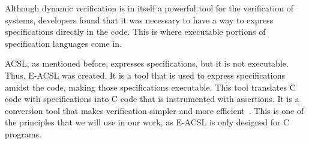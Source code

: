 Although dynamic verification is in itself a powerful tool for the verification of systems, 
developers found that it was necessary to have a way to express specifications directly in the 
code. This is where executable portions of specification languages come in. 

ACSL, as mentioned before, expresses specifications, but it is not executable. Thus, 
E-ACSL was created. It is a tool that is used to express specifications 
amidst the code, making those specifications executable. This tool translates C code with 
specifications into C code that is instrumented with assertions. It is a conversion tool 
that makes verification simpler and more efficient~\cite{Maurica2018}. This is one of the 
principles that we will use in our work, as E-ACSL is only designed for C programs.